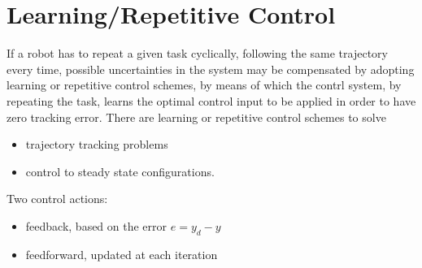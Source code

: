 \documentclass{book}
\begin{document}
\chapter{Learning/Repetitive Control}
If a robot has to repeat a given task cyclically, following the same trajectory every time, possible uncertainties in the system may be compensated by adopting learning or repetitive control schemes, by means of which the contrl system, by repeating the task, learns the optimal control input to be applied in order to have zero tracking error. There are learning or repetitive control schemes to solve 
\begin{itemize}
    \item trajectory tracking problems 
    \item control to steady state configurations.
\end{itemize}
Two control actions: 
\begin{itemize}
    \item feedback, based on the error $e=y_d-y$ 
    \item feedforward, updated at each iteration
\end{itemize}
\end{document}
